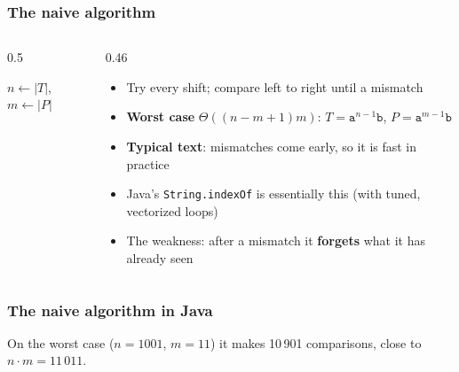 \documentclass[aspectratio=169,10pt,compress]{beamer}
\begin{document}
\begin{frame}[t,fragile] \frametitle{The naive algorithm}
  \begin{columns}[T]
    \begin{column}{0.5\textwidth}
      \SetAlFnt{\small}


\begin{algorithm}[H]
  \caption{NaiveMatcher($T$, $P$)}
  $n \leftarrow |T|$, \quad $m \leftarrow |P|$\;
\end{algorithm}


    \end{column}
    \begin{column}{0.46\textwidth}
      \begin{itemize}\small
        \item Try every shift; compare left to right until a mismatch
        \item \textbf{Worst case} $\Theta((n - m + 1) m)$: $T = \texttt{a}^{n-1}\texttt{b}$, $P = \texttt{a}^{m-1}\texttt{b}$
        \item \textbf{Typical text}: mismatches come early, so it is fast in practice
        \item Java's \texttt{String.indexOf} is essentially this (with tuned, vectorized loops)
        \item The weakness: after a mismatch it \textbf{forgets} what it has already seen
      \end{itemize}
    \end{column}
  \end{columns}
\end{frame}




\begin{frame}[t,fragile] \frametitle{The naive algorithm in Java}

  \vspace{0.2em}
  \small On the worst case ($n = 1001$, $m = 11$) it makes 10\,901 comparisons, close to $n \cdot m = 11\,011$.
\end{frame}
\end{document}
